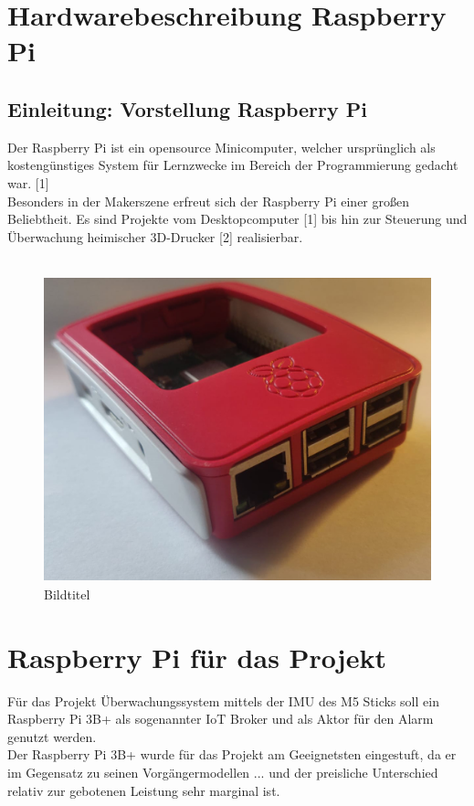 \documentclass[12pt,a4paper,openany]{scrbook}
\begin{document}
	
	 
	\newpage
\chapter*{Hardwarebeschreibung Raspberry Pi}

\section{Einleitung: Vorstellung Raspberry Pi}
Der Raspberry Pi ist ein opensource Minicomputer, welcher ursprünglich als kostengünstiges System für Lernzwecke im Bereich der Programmierung gedacht war. [1]  \\
Besonders in der Makerszene erfreut sich der Raspberry Pi einer großen Beliebtheit. Es sind Projekte vom Desktopcomputer [1] bis hin zur Steuerung und Überwachung heimischer 3D-Drucker [2] realisierbar.\\ 
\\[3mm]


	\begin{figure}[!h]
	\centering
	\includegraphics[height=250pt]{img/pi_mitgehaeuse.png}
	\caption{Bildtitel}
	\label{Bildlabel}
\end{figure}	


\chapter{Raspberry Pi für das Projekt}
Für das Projekt Überwachungssystem mittels der IMU des M5 Sticks soll ein\\ 
Raspberry Pi 3B+ als sogenannter IoT Broker und als Aktor für den Alarm genutzt werden.\\
Der Raspberry Pi 3B+ wurde für das Projekt am Geeignetsten eingestuft, da er im Gegensatz zu seinen Vorgängermodellen ... und der preisliche Unterschied relativ zur gebotenen Leistung sehr marginal ist.  
\end{document}
